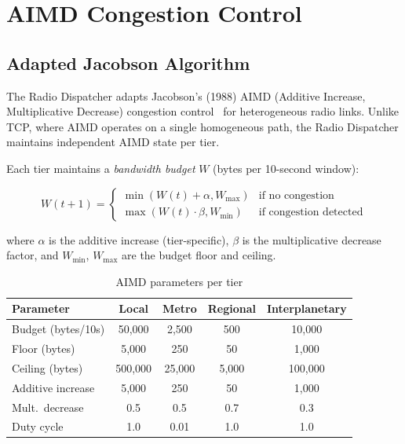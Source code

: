 \documentclass[11pt,twocolumn]{article}
\begin{document}
\section{AIMD Congestion Control}

\subsection{Adapted Jacobson Algorithm}

The Radio Dispatcher adapts Jacobson's (1988) AIMD (Additive Increase,
Multiplicative Decrease) congestion control~\cite{jacobson1988} for
heterogeneous radio links. Unlike TCP, where AIMD operates on a single
homogeneous path, the Radio Dispatcher maintains independent AIMD state
per tier.

Each tier maintains a \emph{bandwidth budget} $W$ (bytes per 10-second window):

\begin{equation}
  W(t+1) = \begin{cases}
    \min(W(t) + \alpha, W_{\max}) & \text{if no congestion} \\
    \max(W(t) \cdot \beta, W_{\min}) & \text{if congestion detected}
  \end{cases}
\end{equation}

where $\alpha$ is the additive increase (tier-specific), $\beta$ is the
multiplicative decrease factor, and $W_{\min}$, $W_{\max}$ are the budget
floor and ceiling.

\begin{table}[H]
\centering
\caption{AIMD parameters per tier}
\label{tab:aimd}
\scriptsize
\begin{tabular}{@{}lcccc@{}}
\toprule
\textbf{Parameter} & \textbf{Local} & \textbf{Metro} & \textbf{Regional} & \textbf{Interplanetary} \\
\midrule
Budget (bytes/10s) & 50,000 & 2,500 & 500 & 10,000 \\
Floor (bytes) & 5,000 & 250 & 50 & 1,000 \\
Ceiling (bytes) & 500,000 & 25,000 & 5,000 & 100,000 \\
Additive increase & 5,000 & 250 & 50 & 1,000 \\
Mult.\ decrease & 0.5 & 0.5 & 0.7 & 0.3 \\
Duty cycle & 1.0 & 0.01 & 1.0 & 1.0 \\
\bottomrule
\end{tabular}
\end{table}
\end{document}
